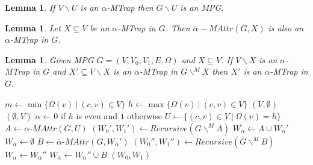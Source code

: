 \documentclass[]{article}
\newtheorem{lemma}[theorem]{Lemma}
\begin{document}
\begin{lemma}
	\label{lem_MPG_sub_trap_is_MPG}
	If $V\backslash U$ is an $\alpha$-MTrap then $G\backslash U$ is an MPG.
\end{lemma}
\begin{lemma}
	\label{lem_MPG_attract_mptrap_is_mptrap}
	Let $X \subseteq V$ be an $\alpha$-MTrap in $G$. Then $\overline{\alpha}{-}MAttr(G,X)$ is also an $\alpha$-MTrap in $G$.
\end{lemma}
\begin{lemma}
	\label{lem_MPG_transitive_mptrap}
	Given MPG $G = (V,V_0,V_1,E,\Omega)$ and $X \subseteq V$. If $V\backslash X$ is an $\alpha$-MTrap in $G$ and $X' \subseteq V\backslash X$ is an $\alpha$-MTrap in $G\backslash^{\!\!M} X$ then $X'$ is an $\alpha$-MTrap in $G$.
\end{lemma}
\begin{algorithm}
	\caption{$\textsc{RecursiveMPG}(\textit{MPG } G = (V,V_0,V_1, E, \Omega)$}
	\begin{algorithmic}[1]
		\State $m \gets \min\{ \Omega(v)\ |\ (c,v) \in V\}$
		\State $h \gets\max\{ \Omega(v)\ |\ (c,v) \in V\}$
		\State \Return $(V,\emptyset)$
		\Else
		\State \Return $(\emptyset, V)$
		\EndIf
		\EndIf
		\State $\alpha \gets 0$ if $h$ is even and $1$ otherwise
		\State $U \gets \{(c,v) \in V\ |\ \Omega(v) = h\}$
		\State $A \gets \alpha\textit{-MAttr}(G, U)$
		\State $(W_0', W_1') \gets \textit{Recursive}(G \backslash^{\!\!M} A)$
		\State $W_\alpha \gets A \cup W_\alpha'$
		\State $W_{\overline{\alpha}} \gets \emptyset$
		\Else
		\State $B \gets \overline{\alpha}\textit{-MAttr}(G,W_{\overline{\alpha}}')$
		\State $(W_0'', W_1'') \gets \textit{Recursive}(G \backslash^{\!\!M} B)$
		\State $W_\alpha \gets W_\alpha''$
		\State $W_{\overline{\alpha}} \gets W_{\overline{\alpha}}'' \cup B$
		\EndIf
		\State \Return $(W_0, W_1)$
	\end{algorithmic}
\end{algorithm}
\end{document}
